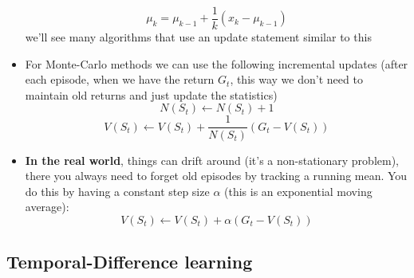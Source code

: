 \documentclass{article}
\begin{document}
\begin{itemize}
    \begin{equation}
        \mu_k = \mu_{k-1}+\frac{1}{k}(x_k-\mu_{k-1})
    \end{equation}
    we'll see many algorithms that use an update statement similar to this
    \item For Monte-Carlo methods we can use the following incremental updates (after each episode, when we have the return $G_t$, this way we don't need to maintain old returns and just update the statistics)
    \begin{equation*}
        N(S_t) \leftarrow N(S_t) + 1 
    \end{equation*}
    \begin{equation*}
        V(S_t) \leftarrow V(S_t) + \frac{1}{N(S_t)}(G_t-V(S_t)) 
    \end{equation*}
    \item \textbf{In the real world}, things can drift around (it's a non-stationary problem), there you always need to forget old episodes by tracking a running mean. You do this by having a constant step size $\alpha$ (this is an exponential moving average):
    \begin{equation}
        V(S_t) \leftarrow V(S_t) + \alpha(G_t-V(S_t)) 
    \end{equation}
\end{itemize}

\subsection{Temporal-Difference learning}
\end{document}
